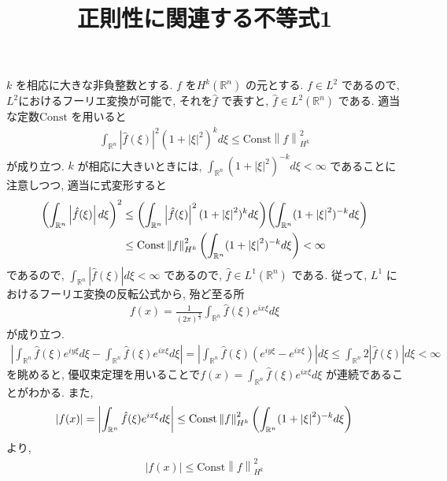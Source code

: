 \documentclass[10pt, fleqn, label-section=none]{bxjsarticle}
\title{正則性に関連する不等式1}
\date{}
\author{}
\theoremstyle{definition}
\newcommand{\paren}[1]{\mleft( #1\mright )}
\newcommand{\abs}[1]{\left|#1\right|}
\newcommand{\norm}[1]{\left\|#1\right\|}
\newcommand{\Const}{\textrm{Const}}
\renewcommand{\;}{\, ; \,}
\begin{document}
\maketitle


\section{}

$k$ を相応に大きな非負整数とする. $f $ を$ H^k(\mathbb R^n)$ の元とする. $f \in L^2$ であるので, $L^2$におけるフーリエ変換が可能で, それを$\hat f$ で表すと, $\hat f \in L^2 (\mathbb R^n)$ である. 適当な定数$\Const$ を用いると
\begin{align*} \int_{\mathbb R^n} \abs{\hat f (\xi)}^2 (1 + \abs{\xi}^2 )^k d\xi  \leq \Const \norm{f}_{H^k}^2 \end{align*}
が成り立つ. $k$ が相応に大きいときには, $\int_{\mathbb R^n} (1 + \abs{\xi }^2 )^{-k}  d\xi < \infty$ であることに注意しつつ, 適当に式変形すると
\begin{align*} \paren{\int_{\mathbb R^n} \abs{\hat f (\xi) } d\xi}^2 &\leq \paren{\int_{\mathbb R^n} \abs{\hat f (\xi)} ^2 (1 + \abs{\xi}^2 ) ^k d \xi}\paren{\int_{\mathbb R^n} (1 + \abs{\xi }^2 )^{-k}  d\xi } \\
&\leq \Const \norm{f}^2_{H^k} \paren{\int_{\mathbb R^n} (1 + \abs{\xi }^2 )^{-k}  d\xi } < \infty \end{align*}
であるので, $\int_{\mathbb R^n} \abs{\hat f (\xi) } d\xi < \infty$ であるので, $\hat f \in L^1 (\mathbb R^n)$ である. 従って, $L^1$ におけるフーリエ変換の反転公式から, 殆ど至る所
\begin{align*} f(x) = \frac{1}{(2 \pi)^{\frac{n}{2}} } \int_{\mathbb R^n} \hat f (\xi) e^{ix \xi} d\xi  \end{align*}
が成り立つ.
\begin{align*} \abs {\int_{\mathbb R^n} \hat f (\xi) e^{iy \xi} d\xi - \int_{\mathbb R^n} \hat f (\xi) e^{ix \xi} d\xi } = \abs{\int_{\mathbb R^n} \hat f (\xi) (e^{iy \xi}  - e^{ix \xi} )} d\xi \leq \int_{\mathbb R^n} 2 \abs{\hat f (\xi)}  d\xi   < \infty  \end{align*}
を眺めると, 優収束定理を用いることで$f(x) = \int_{\mathbb R^n} \hat f (\xi) e^{ix \xi} d\xi $ が連続であることがわかる. 
また, 
\begin{align*} \abs{f(x)} = \abs{\int_{\mathbb R^n} \hat f (\xi) e^{ix \xi} d\xi} \leq \Const \norm{f}^2_{H^k} \paren{\int_{\mathbb R^n} (1 + \abs{\xi }^2 )^{-k}  d\xi }  \end{align*}
より, 
\begin{align*} \abs{f(x)} \leq \Const \norm{f}^2_{H^k}  \end{align*}
\end{document}
